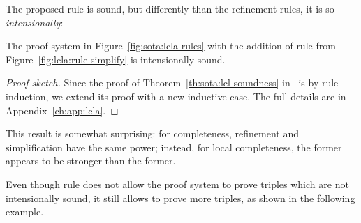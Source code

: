The proposed rule  is sound, but differently than the refinement rules, it is so \emph{intensionally}:

\begin{theorem}\label{th:lcla:soundness-rule-simpl}
	The proof system in Figure~\ref{fig:sota:lcla-rules} with the addition of rule  from Figure~\ref{fig:lcla:rule-simplify} is intensionally sound.
\end{theorem}
\begin{proof}[Proof sketch]
	Since the proof of Theorem~\ref{th:sota:lcl-soundness} in~\cite{BGGR21} is by rule induction, we extend its proof with a new inductive case. The full details are in Appendix~\ref{ch:app:lcla}.
\end{proof}

This result is somewhat surprising: for completeness, refinement and simplification have the same power; instead, for local completeness, the former appears to be stronger than the former.

Even though rule  does not allow the proof system to prove triples which are not intensionally sound, it still allows to prove more triples, as shown in the following example.

